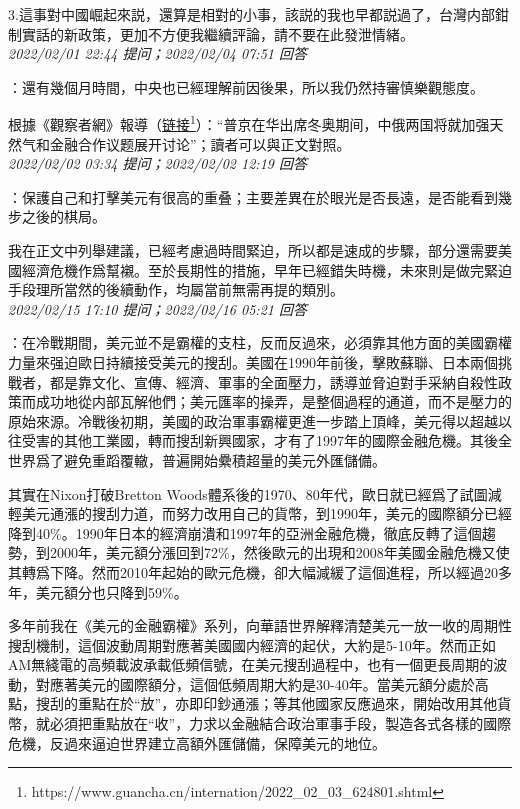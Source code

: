\documentclass[twocolumn]{ctexart}
\begin{document}
3.這事對中國崛起來説，還算是相對的小事，該説的我也早都説過了，台灣内部鉗制實話的新政策，更加不方便我繼續評論，請不要在此發泄情緒。
\\

\textit{\hfill\noindent\small 2022/02/01 22:44 提问；2022/02/04 07:51 回答}

：還有幾個月時間，中央也已經理解前因後果，所以我仍然持審慎樂觀態度。


根據《觀察者網》報導（\href{https://www.guancha.cn/internation/2022\_02\_03\_624801.shtml}{链接\footnote{\url{https://www.guancha.cn/internation/2022\_02\_03\_624801.shtml}}}）：“普京在华出席冬奥期间，中俄两国将就加强天然气和金融合作议题展开讨论”；讀者可以與正文對照。
\\

\textit{\hfill\noindent\small 2022/02/02 03:34 提问；2022/02/02 12:19 回答}

：保護自己和打擊美元有很高的重叠；主要差異在於眼光是否長遠，是否能看到幾步之後的棋局。

我在正文中列舉建議，已經考慮過時間緊迫，所以都是速成的步驟，部分還需要美國經濟危機作爲幫襯。至於長期性的措施，早年已經錯失時機，未來則是做完緊迫手段理所當然的後續動作，均屬當前無需再提的類別。
\\

\textit{\hfill\noindent\small 2022/02/15 17:10 提问；2022/02/16 05:21 回答}

：在冷戰期間，美元並不是霸權的支柱，反而反過來，必須靠其他方面的美國霸權力量來强迫歐日持續接受美元的搜刮。美國在1990年前後，擊敗蘇聯、日本兩個挑戰者，都是靠文化、宣傳、經濟、軍事的全面壓力，誘導並脅迫對手采納自殺性政策而成功地從内部瓦解他們；美元匯率的操弄，是整個過程的通道，而不是壓力的原始來源。冷戰後初期，美國的政治軍事霸權更進一步踏上頂峰，美元得以超越以往受害的其他工業國，轉而搜刮新興國家，才有了1997年的國際金融危機。其後全世界爲了避免重蹈覆轍，普遍開始纍積超量的美元外匯儲備。

其實在Nixon打破Bretton Woods體系後的1970、80年代，歐日就已經爲了試圖減輕美元通漲的搜刮力道，而努力改用自己的貨幣，到1990年，美元的國際額分已經降到40\%。1990年日本的經濟崩潰和1997年的亞洲金融危機，徹底反轉了這個趨勢，到2000年，美元額分漲回到72\%，然後歐元的出現和2008年美國金融危機又使其轉爲下降。然而2010年起始的歐元危機，卻大幅減緩了這個進程，所以經過20多年，美元額分也只降到59\%。

多年前我在《美元的金融霸權》系列，向華語世界解釋清楚美元一放一收的周期性搜刮機制，這個波動周期對應著美國國内經濟的起伏，大約是5-10年。然而正如AM無綫電的高頻載波承載低頻信號，在美元搜刮過程中，也有一個更長周期的波動，對應著美元的國際額分，這個低頻周期大約是30-40年。當美元額分處於高點，搜刮的重點在於“放”，亦即印鈔通漲；等其他國家反應過來，開始改用其他貨幣，就必須把重點放在“收”，力求以金融結合政治軍事手段，製造各式各樣的國際危機，反過來逼迫世界建立高額外匯儲備，保障美元的地位。
\end{document}
